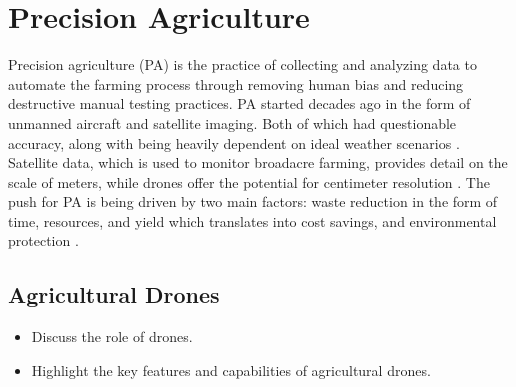 \documentclass{IEEEtran}
\begin{document}

\section{Precision Agriculture}
Precision agriculture (PA) is the practice of collecting and analyzing data to automate the farming process through removing human bias and reducing destructive manual testing practices. PA started decades ago
in the form of unmanned aircraft and satellite imaging. Both of which had questionable accuracy, along with being heavily dependent on ideal weather scenarios \cite{HAFEEZ2023192}. Satellite data, which is used
to monitor broadacre farming, provides detail on the scale of meters, while drones offer the potential for centimeter resolution \cite{Huuskonen_Oksanen_2018b}. The push for PA is being driven by two main factors: waste reduction in the form
of time, resources, and yield which translates into cost savings, and environmental protection \cite{HAFEEZ2023192}.

\subsection{Agricultural Drones}
    \begin{itemize}
        \item Discuss the role of drones.
        \item Highlight the key features and capabilities of agricultural drones.
    \end{itemize}
\end{document}
